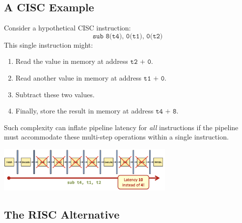 \subsection{A CISC Example}
Consider a hypothetical CISC instruction:
\[
\texttt{sub 8(t4), 0(t1), 0(t2)}
\]
This single instruction might:
\begin{enumerate}
    \item Read the value in memory at address \(\texttt{t2 + 0}\).
    \item Read another value in memory at address \(\texttt{t1 + 0}\).
    \item Subtract these two values.
    \item Finally, store the result in memory at address \(\texttt{t4 + 8}\).
\end{enumerate}
Such complexity can inflate pipeline latency for \emph{all} instructions if the pipeline must accommodate these multi-step operations within a single instruction.
\begin{center}
    \includegraphics[width=0.65\textwidth]{chapters/chapter4c/images/cisc.png}
\end{center}
\subsection{The RISC Alternative}

